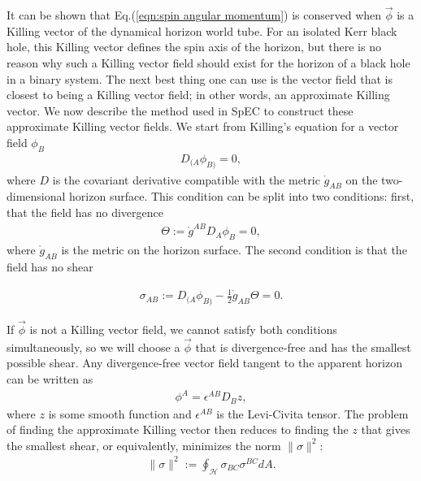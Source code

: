 \documentclass{iopjournal}
\begin{document}
It can be shown that Eq.(\ref{eqn:spin angular momentum}) is conserved \cite{lovelace08_73} when $\vec{\phi}$ is a Killing vector of the dynamical horizon world tube. For an isolated Kerr black hole, this Killing vector defines the spin axis of the horizon, but there is no reason why such a Killing vector field should exist for the horizon of a black hole in a binary system. The next best thing one can use is the vector field that is closest to being a Killing vector field; in other words, an approximate Killing vector. We now describe the method used in SpEC to construct these approximate Killing vector fields. We start from Killing's equation for a vector field $\phi_{B}$
\begin{align}
D_{(A} \phi_{B)}=0,
\end{align}
where $D$ is the covariant derivative compatible with the metric $\mathring{g}_{A B}$ on the two-dimensional horizon surface.
This condition can be split into two conditions: first, that the field has no divergence
\begin{align}
\Theta:= \mathring{g}^{A B} D_A \phi_B=0,
\end{align}
where $\mathring{g}_{A B}$ is the metric on the horizon surface.
The second condition is that the field has no shear

\begin{align}
\sigma_{A B}:=D_{(A} \phi_{B)}-\frac{1}{2} \mathring{g}_{A B} \Theta=0.
\label{eqn:shear in terms of phi}
\end{align}

If $\vec{\phi}$ is not a Killing vector field, we cannot satisfy both conditions simultaneously, so we will choose a $\vec{\phi}$ that is divergence-free and has the smallest possible shear. Any divergence-free vector field tangent to the apparent horizon can be written as
\begin{align}
    \phi^{A} = \epsilon^{AB}  D_{B} z,
    \label{eqn:phi in terms of z}
\end{align}
where $z$ is some smooth function and $\epsilon^{AB}$ is the Levi-Civita tensor. The problem of finding the approximate Killing vector then reduces to finding the $z$ that gives the smallest shear, or equivalently, minimizes the norm $\|\sigma\|^2$:
\begin{align}
\|\sigma\|^2:=\oint_{\mathcal{H}} \sigma_{B C} \sigma^{B C} d A .
\end{align}
\end{document}
